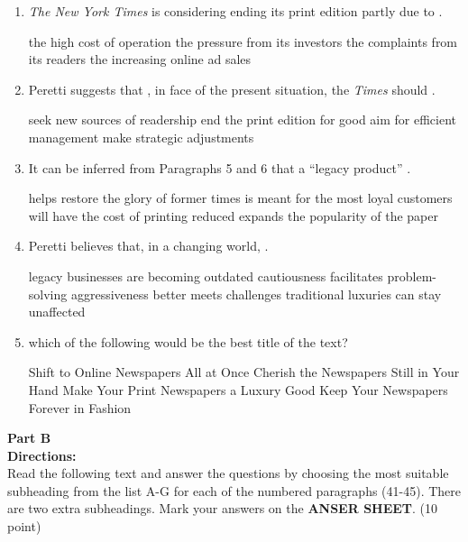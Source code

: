\begin{enumerate}[resume]
	\item
\emph{The New York Times} is considering ending its print
edition partly due to \lineread.


\fourchoices
{the high cost of operation}
{the pressure from its investors}
{the complaints from its readers}
{the increasing online ad sales}


\item
Peretti suggests that , in face of the present
situation, the \emph{Times} should \lineread.


\fourchoices
{seek new sources of readership}
{end the print edition for good}
{aim for efficient management}
{make strategic adjustments}

\item
 It can be inferred from Paragraphs 5 and 6 that a ``legacy
product'' \lineread.


\fourchoices
{helps restore the glory of former times}
{is meant for the most loyal customers}
{will have the cost of printing reduced}
{expands the popularity of the paper}



\item
Peretti believes that, in a changing world, \lineread.


\fourchoices
{legacy businesses are becoming outdated}
{cautiousness facilitates problem-solving}
{aggressiveness better meets challenges}
{traditional luxuries can stay unaffected}



\item
which of the following would be the best title of the
text?


\fourchoices
{Shift to Online Newspapers All at Once}
{Cherish the Newspapers Still in Your Hand}
{Make Your Print Newspapers a Luxury Good}
{Keep Your Newspapers Forever in Fashion}




\end{enumerate}

\newpage
\noindent
\textbf{Part B}\\
\textbf{ Directions:}\\
 Read the following text and answer the questions by choosing
	the most suitable subheading from the list A-G for each of the numbered
	paragraphs (41-45). There are two extra subheadings. Mark your answers
	on the \textbf{ANSER SHEET}. (10 point)


